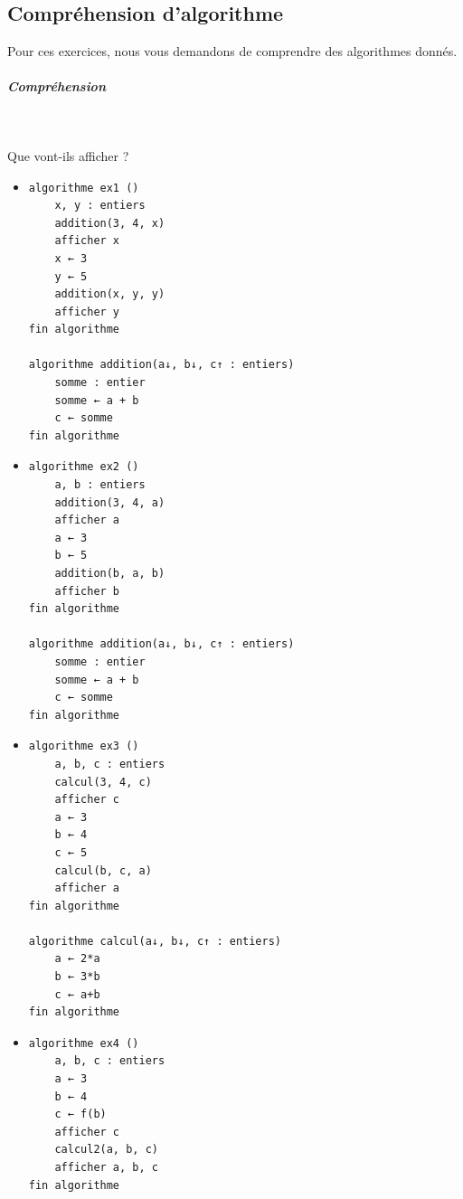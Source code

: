 \documentclass[11pt,a4paper]{article}
\begin{document}
            \par
        \subsection{Compr\'ehension d'algorithme}
          Pour ces exercices, nous vous demandons de comprendre des algorithmes donn\'es. 
          
			
		\subparagraph{Compr\'ehension} 
		
                \textcolor{white}{.} \par
            
							  Que vont-ils afficher ?
              
					\begin{itemize}
				
			\item \begin{verbatim}
algorithme ex1 ()
    x, y : entiers
    addition(3, 4, x)
    afficher x
    x ← 3
    y ← 5
    addition(x, y, y)
    afficher y
fin algorithme

algorithme addition(a↓, b↓, c↑ : entiers)
    somme : entier
    somme ← a + b
    c ← somme
fin algorithme
				\end{verbatim} \textcolor{gray}{\underline{\hspace*{1em}}}  \textcolor{gray}{\underline{\hspace*{1em}}} 
			\item \begin{verbatim}
algorithme ex2 ()
    a, b : entiers
    addition(3, 4, a)
    afficher a
    a ← 3
    b ← 5
    addition(b, a, b)
    afficher b
fin algorithme

algorithme addition(a↓, b↓, c↑ : entiers)
    somme : entier
    somme ← a + b
    c ← somme
fin algorithme
				\end{verbatim} \textcolor{gray}{\underline{\hspace*{1em}}}  \textcolor{gray}{\underline{\hspace*{1em}}} 
			\item \begin{verbatim}
algorithme ex3 ()
    a, b, c : entiers
    calcul(3, 4, c)
    afficher c
    a ← 3
    b ← 4
    c ← 5
    calcul(b, c, a)
    afficher a
fin algorithme

algorithme calcul(a↓, b↓, c↑ : entiers)
    a ← 2*a
    b ← 3*b
    c ← a+b
fin algorithme
				            \end{verbatim} \textcolor{gray}{\underline{\hspace*{2em}}}  \textcolor{gray}{\underline{\hspace*{2em}}} 
			\item \begin{verbatim}
algorithme ex4 ()
    a, b, c : entiers
    a ← 3
    b ← 4
    c ← f(b)
    afficher c
    calcul2(a, b, c)
    afficher a, b, c
fin algorithme


\end{verbatim}
\end{itemize}
\end{document}
